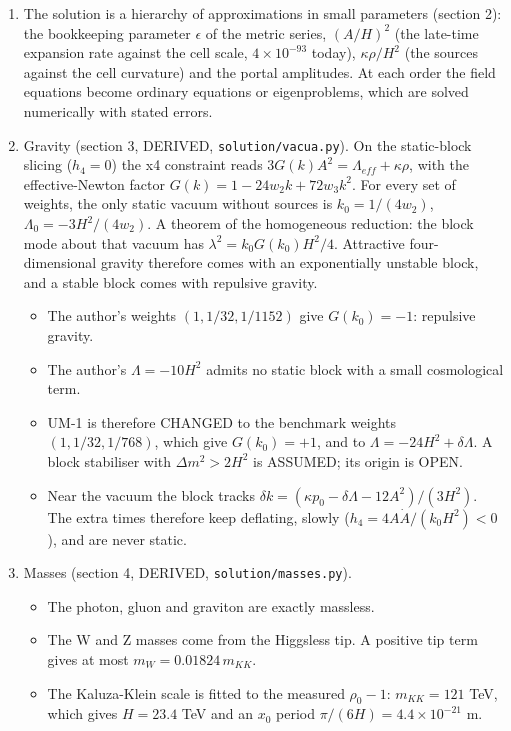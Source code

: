 \documentclass[11pt]{article}
\begin{document}
\begin{enumerate}
\item The solution is a hierarchy of approximations in small parameters (section 2): the bookkeeping parameter $\epsilon$ of the metric series, $(A/H)^2$ (the late-time expansion rate against the cell scale, $4\times10^{-93}$ today), $\kappa\rho/H^2$ (the sources against the cell curvature) and the portal amplitudes. At each order the field equations become ordinary equations or eigenproblems, which are solved numerically with stated errors.
\item Gravity (section 3, DERIVED, \texttt{solution/\allowbreak{}vacua.\allowbreak{}py}). On the static-block slicing ($h_4 = 0$) the x4 constraint reads $3G(k)A^2 = \Lambda_{eff} + \kappa\rho$, with the effective-Newton factor $G(k) = 1 - 24w_2k + 72w_3k^2$. For every set of weights, the only static vacuum without sources is $k_0 = 1/(4w_2)$, $\Lambda_0 = -3H^2/(4w_2)$. A theorem of the homogeneous reduction: the block mode about that vacuum has $\lambda^2 = k_0G(k_0)H^2/4$. Attractive four-dimensional gravity therefore comes with an exponentially unstable block, and a stable block comes with repulsive gravity.
\begin{itemize}
\item The author's weights $(1, 1/32, 1/1152)$ give $G(k_0) = -1$: repulsive gravity.
\item The author's $\Lambda = -10H^2$ admits no static block with a small cosmological term.
\item UM-1 is therefore CHANGED to the benchmark weights $(1, 1/32, 1/768)$, which give $G(k_0) = +1$, and to $\Lambda = -24H^2 + \delta\Lambda$. A block stabiliser with $\Delta m^2 > 2H^2$ is ASSUMED; its origin is OPEN.
\item Near the vacuum the block tracks $\delta k = (\kappa p_0 - \delta\Lambda - 12A^2)/(3H^2)$. The extra times therefore keep deflating, slowly ($h_4 = 4A\dot A/(k_0H^2) < 0$), and are never static.
\end{itemize}
\item Masses (section 4, DERIVED, \texttt{solution/\allowbreak{}masses.\allowbreak{}py}).
\begin{itemize}
\item The photon, gluon and graviton are exactly massless.
\item The W and Z masses come from the Higgsless tip. A positive tip term gives at most $m_W = 0.01824\,m_{KK}$.
\item The Kaluza-Klein scale is fitted to the measured $\rho_0 - 1$: $m_{KK} = 121$ TeV, which gives $H = 23.4$ TeV and an $x_0$ period $\pi/(6H) = 4.4\times10^{-21}$ m.

\end{itemize}
\end{enumerate}
\end{document}
